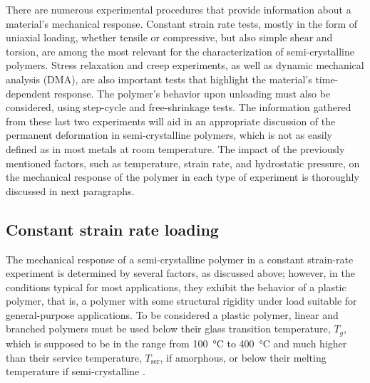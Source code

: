There are numerous experimental procedures that provide information about a material's mechanical response.
Constant strain rate tests, mostly in the form of uniaxial loading, whether tensile or compressive, but also simple shear and torsion, are among the most relevant for the characterization of semi-crystalline polymers.
Stress relaxation and creep experiments, as well as dynamic mechanical analysis (DMA), are also important tests that highlight the material's time-dependent response.
The polymer's behavior upon unloading must also be considered, using step-cycle and free-shrinkage tests.
The information gathered from these last two experiments will aid in an appropriate discussion of the permanent deformation in semi-crystalline polymers, which is not as easily defined as in most metals at room temperature.
The impact of the previously mentioned factors, such as temperature, strain rate, and hydrostatic pressure, on the mechanical response of the polymer in each type of experiment is thoroughly discussed in next paragraphs.

\subsection{Constant strain rate loading}

The mechanical response of a semi-crystalline polymer in a constant strain-rate experiment is determined by several factors, as discussed above; however, in the conditions typical for most applications, they exhibit the behavior of a plastic polymer, that is, a polymer with some structural rigidity under load suitable for general-purpose applications.
To be considered a plastic polymer, linear and branched polymers must be used below their glass transition temperature, $T_g$, which is supposed to be in the range from \SI{100}{\celsius} to \SI{400}{\celsius} and much higher than their service temperature, $T_\mathrm{ser}$, if amorphous, or below their melting temperature if semi-crystalline \citep{callister2014materials, arzhakovRelaxationPhysicalMechanical2019}.

